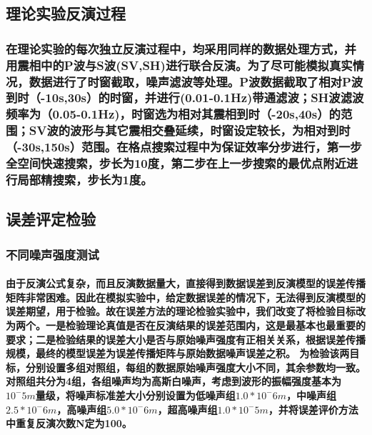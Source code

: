 \documentclass[a4paper,12pt,single,pdftex]{scrartcl}
\begin{document}
\label{ID_1720353574}\subsection{理论实验反演过程}

\label{ID_1894488209}\subsubsection{}

\label{ID_1185467957}\subsubsection{}

\label{ID_260745033}\subsubsection{在理论实验的每次独立反演过程中，均采用同样的数据处理方式，并用震相中的P波与S波(SV,SH)进行联合反演。为了尽可能模拟真实情况，数据进行了时窗截取，噪声滤波等处理。P波数据截取了相对P波到时（-10s,30s）的时窗，并进行(0.01-0.1Hz)带通滤波；SH波滤波频率为（0.05-0.1Hz)，时窗选为相对其震相到时（-20s,40s）的范围；SV波的波形与其它震相交叠延续，时窗设定较长，为相对到时（-30s,150s）范围。在格点搜索过程中为保证效率分步进行，第一步全空间快速搜索，步长为10度，第二步在上一步搜索的最优点附近进行局部精搜索，步长为1度。}

\label{ID_146378205}\subsection{误差评定检验}

\label{ID_1408987114}\subsubsection{不同噪声强度测试}

\label{ID_118132279}\paragraph{由于反演公式复杂，而且反演数据量大，直接得到数据误差到反演模型的误差传播矩阵非常困难。因此在模拟实验中，给定数据误差的情况下，无法得到反演模型的误差期望，用于检验。故在误差方法的理论检验实验中，我们改变了将检验目标改为两个。一是检验理论真值是否在反演结果的误差范围内，这是最基本也最重要的要求；二是检验结果的误差大小是否与原始噪声强度有正相关关系，根据误差传播规模，最终的模型误差为误差传播矩阵与原始数据噪声误差之积。
为检验该两目标，分别设置多组对照组，每组的数据原始噪声强度大小不同，其余参数均一致。对照组共分为4组，各组噪声均为高斯白噪声，考虑到波形的振幅强度基本为$10^-5m$量级，将噪声标准差大小分别设置为低噪声组$1.0*10^-6m$，中噪声组$2.5*10^-6m$，高噪声组$5.0*10^-6m$，超高噪声组$1.0*10^-5m$，并将误差评价方法中重复反演次数N定为100。}
\end{document}
